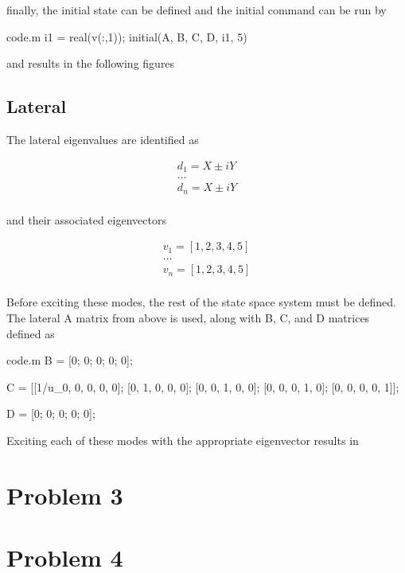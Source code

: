 \documentclass[12pt]{article}
\begin{document}
\noindent finally, the initial state can be defined and the initial command can be run by
\begin{filecontents*}{code.m}
i1 = real(v(:,1));
initial(A, B, C, D, i1, 5)
\end{filecontents*}


\noindent and results in the following figures

\subsection{Lateral}
\noindent The lateral eigenvalues are identified as

\begin{equation*}
\begin{split}
d_1 = X \pm i Y \\
\ldots \\
d_n = X \pm i Y \\
\end{split}
\end{equation*}

\noindent and their associated eigenvectors

\begin{equation*}
\begin{split}
v_1 = [1, 2, 3, 4, 5] \\
\ldots \\
v_n = [1, 2, 3, 4, 5] \\
\end{split}
\end{equation*}

\noindent Before exciting these modes, the rest of the state space system must be defined. The lateral A matrix from above is used, along with B, C, and D matrices defined as
\begin{filecontents*}{code.m}
B = [0; 0; 0; 0; 0];

C = [[1/u_0, 0, 0, 0, 0];
     [0, 1, 0, 0, 0];
     [0, 0, 1, 0, 0];
     [0, 0, 0, 1, 0];
     [0, 0, 0, 0, 1]];

D = [0; 0; 0; 0; 0];
\end{filecontents*}


\noindent Exciting each of these modes with the appropriate eigenvector results in

\newpage
\section{Problem 3}
\section{Problem 4}
\end{document}
